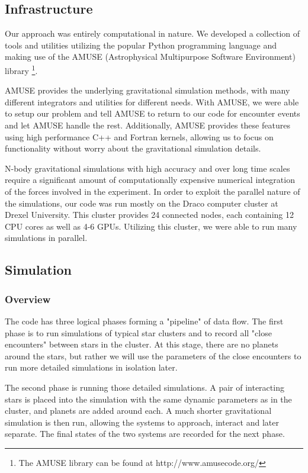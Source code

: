 \documentclass[12pt]{article}
\begin{document}
    \subsection{Infrastructure}

    Our approach was entirely computational in nature. We developed a collection of tools
    and utilities utilizing the popular Python programming language and making use
    of the AMUSE (Astrophysical Multipurpose Software Environment) library \footnote{The AMUSE library can be found at http://www.amusecode.org/}. 

    AMUSE provides the underlying gravitational simulation methods, with many different
    integrators and utilities for different needs. With AMUSE, we were able to 
    setup our problem and tell AMUSE to return to our code for encounter events and
    let AMUSE handle the rest. Additionally, AMUSE provides these features using high
    performance C++ and Fortran kernels, allowing us to focus on functionality without
    worry about the gravitational simulation details.

    N-body gravitational simulations with high accuracy and over long time scales require
    a significant amount of computationally expensive numerical integration of the 
    forces involved in the experiment. In order to exploit the parallel nature of 
    the simulations, our code was run mostly on the Draco computer 
    cluster at Drexel University. This cluster provides 24 connected nodes, each containing
    12 CPU cores as well as 4-6 GPUs. Utilizing this cluster, we were able to run many simulations in parallel.

    \subsection{Simulation}

    \subsubsection{Overview}

    The code has three logical phases forming a "pipeline" of data flow. 
    The first phase is to run simulations of typical
    star clusters and to record all "close encounters" between stars in the cluster.
    At this stage, there are no planets around the stars, but rather we will use the
    parameters of the close encounters to run more detailed simulations in isolation
    later.

    The second phase is running those detailed simulations. A pair of interacting stars
    is placed into the simulation with the same dynamic parameters as in the cluster,
    and planets are added around each. A much shorter gravitational simulation is then
    run, allowing the systems to approach, interact and later separate. The final
    states of the two systems are recorded for the next phase.
\end{document}
